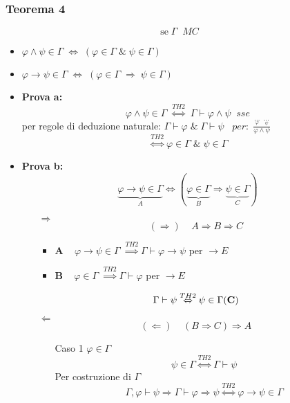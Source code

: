 \documentclass{article}
\theoremstyle{break}
\theoremstyle{break}
\theoremstyle{break}
\theoremstyle{break}
\begin{document}
\subsubsection{Teorema 4}
\[
  \text{se}\;\Gamma\;\;MC
\] 
\begin{itemize}
  \item \( \varphi \wedge \psi \in \Gamma\; \Leftrightarrow\; (\varphi \in \Gamma\;\&\; \psi \in\Gamma)\) 
  \item \( \varphi \to \psi \in \Gamma\; \Leftrightarrow\; (\varphi \in  \Gamma \;\Rightarrow\; \psi \in \Gamma) \) 
\end{itemize}
\begin{itemize}
  \item 
    \textbf{Prova a:}
    \[
      \varphi \wedge \psi \in \Gamma \; \stackrel{TH2}{\Leftrightarrow}\; \Gamma \vdash \varphi \wedge \psi\;\;sse 
    \] 
    per regole di deduzione naturale: \( \Gamma \vdash \varphi \;\&\; \Gamma \vdash \psi\;\;\; per:\; \frac{\underset{\varphi}{\ldots}\;\;\underset{\psi}{\ldots}}{\varphi \wedge \psi} \) 
    \[
      \stackrel{TH2}{\Leftrightarrow} \varphi \in \Gamma\;\&\; \psi \in \Gamma
    \] 
  \item \textbf{Prova b:}
    \[
      \underbrace{\varphi \to \psi \in \Gamma}_{A} \Leftrightarrow (\underbrace{\varphi \in  \Gamma}_{B} \Rightarrow \underbrace{\psi \in \Gamma}_{C})
    \] 
    \begin{enumerate}
      \item [\( \Rightarrow\)] 
        \[
          (\Rightarrow)\;\;\;\;        A \Rightarrow B \Rightarrow C
        \] 
        \begin{itemize}
          \item \textbf{A} \( \;\;\; \varphi \to  \psi \in \Gamma\; \stackrel{TH2}{\Rightarrow} \Gamma \vdash \varphi \to \psi \) per \( \to E \) 
          \item \textbf{B} \( \;\;\;\varphi \in \Gamma\; \stackrel{TH2}{\Rightarrow} \Gamma \vdash \varphi \) per \( \to E \) 
        \end{itemize}
        \[
          \Gamma \vdash \psi \stackrel{TH2}{\Leftrightarrow} \psi \in \Gamma (\text{\textbf{C}})
        \] 
      \item [\( \Leftarrow \) ]
        \[
          (\Leftarrow)\;\;\;\; (B \Rightarrow C) \Rightarrow A
        \] 
        \begin{enumerate}
          \item [Caso 1] \( \varphi \in \Gamma \) 
            \[
              \psi \in \Gamma \stackrel{TH2}{\Leftrightarrow} \Gamma \vdash \psi
            \] 
            Per costruzione di \( \Gamma \) 
            \[
              \Gamma,\varphi \vdash \psi \Rightarrow \Gamma \vdash \varphi \Rightarrow \psi \stackrel{TH2}{\Leftrightarrow} \varphi \to \psi \in \Gamma
            \] 


\end{enumerate}
\end{enumerate}
\end{itemize}
\end{document}
